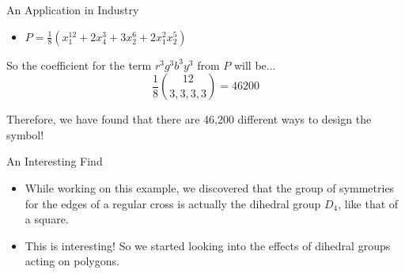 \documentclass{beamer}
\begin{document}
\begin{frame}{An Application in Industry}

  \begin{itemize}
    \item $P = \frac{1}{8}(x_1^{12}+2x_4^3 +3x_2^6 +2x_1^2 x_2^5)$
  \end{itemize}
  So the coefficient for the term $r^3g^3b^3y^3$ from $P$ will be...\\

  \[\frac{1}{8}{{12}\choose{3,3,3,3}}=46200\]

  \vspace{40pt}
  Therefore, we have found that there are 46,200 different ways to design the symbol!

\end{frame}

\begin{frame}{An Interesting Find}
  \begin{itemize}
    \item While working on this example, we discovered that the group of symmetries for the edges of a regular cross is actually the dihedral group $D_4$, like that of a square.
    \item This is interesting! So we started looking into the effects of dihedral groups acting on polygons.
  \end{itemize}
\end{frame}
\end{document}
